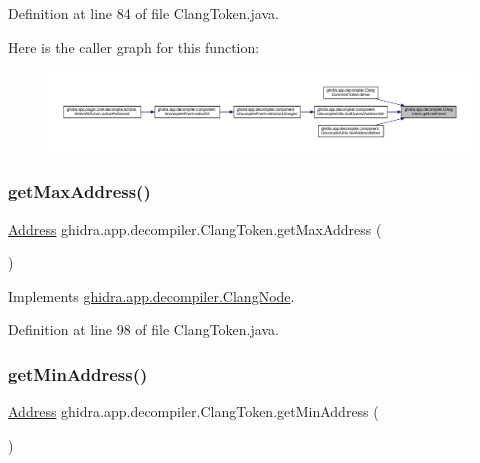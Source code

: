 Definition at line 84 of file Clang\+Token.\+java.

Here is the caller graph for this function\+:
\nopagebreak
\begin{figure}[H]
\begin{center}
\leavevmode
\includegraphics[width=350pt]{classghidra_1_1app_1_1decompiler_1_1_clang_token_aea8250f4e75b6fe1cd225ae52fa9a84b_icgraph}
\end{center}
\end{figure}
\mbox{\label{classghidra_1_1app_1_1decompiler_1_1_clang_token_aba3444e5da7a465cb090f4a7f15d8889}} 
\subsubsection{\texorpdfstring{getMaxAddress()}{getMaxAddress()}}
{\footnotesize\ttfamily \mbox{\hyperlink{class_address}{Address}} ghidra.\+app.\+decompiler.\+Clang\+Token.\+get\+Max\+Address (\begin{DoxyParamCaption}{ }\end{DoxyParamCaption})\hspace{0.3cm}{\ttfamily [inline]}}



Implements \mbox{\hyperlink{interfaceghidra_1_1app_1_1decompiler_1_1_clang_node_a91e8beccce17b875e07d7c0747b43a97}{ghidra.\+app.\+decompiler.\+Clang\+Node}}.



Definition at line 98 of file Clang\+Token.\+java.

\mbox{\label{classghidra_1_1app_1_1decompiler_1_1_clang_token_ad29a43e8aae3a2250fcb8632a4010993}} 
\subsubsection{\texorpdfstring{getMinAddress()}{getMinAddress()}}
{\footnotesize\ttfamily \mbox{\hyperlink{class_address}{Address}} ghidra.\+app.\+decompiler.\+Clang\+Token.\+get\+Min\+Address (\begin{DoxyParamCaption}{ }\end{DoxyParamCaption})\hspace{0.3cm}{\ttfamily [inline]}}



